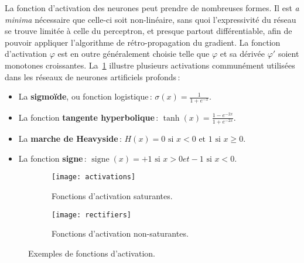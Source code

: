 La fonction d'activation des neurones peut prendre de nombreuses formes. Il est \emph{a minima} nécessaire que celle-ci soit non-linéaire, sans quoi l'expressivité du réseau se trouve limitée à celle du perceptron, et presque partout différentiable, afin de pouvoir appliquer l'algorithme de rétro-propagation du gradient. La fonction d'activation $\varphi$ est en outre généralement choisie telle que $\varphi$ et sa dérivée $\varphi'$ soient monotones croissantes. La~\cref{fig:saturantes} illustre plusieurs activations communément utilisées dans les réseaux de neurones artificiels profonds\,:
\begin{itemize}
  \item La \textbf{sigmoïde}, ou fonction logistique\,: $\sigma(x) = \frac{1}{1 + e^{-x}}$.
  \item La fonction \textbf{tangente hyperbolique}\,: $\tanh(x) = \frac{1 - e^{-2x}}{1 + e^{-2x}}$.
  \item La \textbf{marche de Heavyside}\,: $H(x) = 0 \text{ si } x < 0 \text{ et } 1 \text{ si } x \geq 0$.
  \item La fonction \textbf{signe}\,: $\operatorname{signe}(x) = +1 \text{ si } x > 0 et -1 \text{ si } x < 0$.
\end{itemize}

\begin{figure}[t]
  \begin{subfigure}[b]{0.5\textwidth}
    \texttt{[image: activations]}
    \caption{Fonctions d'activation saturantes.}
    \label{fig:saturantes}
  \end{subfigure}
\begin{subfigure}[b]{0.5\textwidth}
  \texttt{[image: rectifiers]}
  \caption{Fonctions d'activation non-saturantes.}
  \label{fig:rectifiers}
\end{subfigure}
\caption{Exemples de fonctions d'activation.}
\label{fig:activations}
\end{figure}

